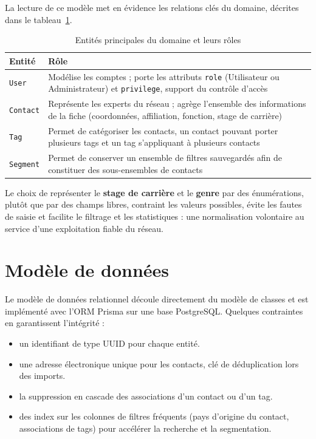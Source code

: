 La lecture de ce modèle met en évidence les relations clés du domaine, décrites dans le tableau~\ref{tab:entites}.

\begin{table}[H]
\centering
\small
\begin{tabularx}{\textwidth}{|l|X|}
\hline
\textbf{Entité} & \textbf{Rôle} \\
\hline
\texttt{User} & Modélise les comptes ; porte les attributs \texttt{role} (Utilisateur ou Administrateur) et \texttt{privilege}, support du contrôle d'accès \\
\hline
\texttt{Contact} & Représente les experts du réseau ; agrège l'ensemble des informations de la fiche (coordonnées, affiliation, fonction, stage de carrière) \\
\hline
\texttt{Tag} & Permet de catégoriser les contacts, un contact pouvant porter plusieurs tags et un tag s'appliquant à plusieurs contacts \\
\hline
\texttt{Segment} & Permet de conserver un ensemble de filtres sauvegardés afin de constituer des sous-ensembles de contacts \\
\hline
\end{tabularx}
\caption{Entités principales du domaine et leurs rôles}
\label{tab:entites}
\end{table}

Le choix de représenter le \textbf{stage de carrière} et le \textbf{genre} par des énumérations, plutôt que par des champs libres, contraint les valeurs possibles, évite les fautes de saisie et facilite le filtrage et les statistiques : une normalisation volontaire au service d'une exploitation fiable du réseau.

\section{Modèle de données}

Le modèle de données relationnel découle directement du modèle de classes et est implémenté avec l'\acf{ORM} Prisma sur une base PostgreSQL. Quelques contraintes en garantissent l'intégrité :
\begin{itemize}[leftmargin=*,itemsep=2pt]
  \item un identifiant de type UUID pour chaque entité.
  \item une adresse électronique unique pour les contacts, clé de déduplication lors des imports.
  \item la suppression en cascade des associations d'un contact ou d'un tag.
  \item des index sur les colonnes de filtres fréquents (pays d'origine du contact, associations de tags) pour accélérer la recherche et la segmentation.
\end{itemize}

